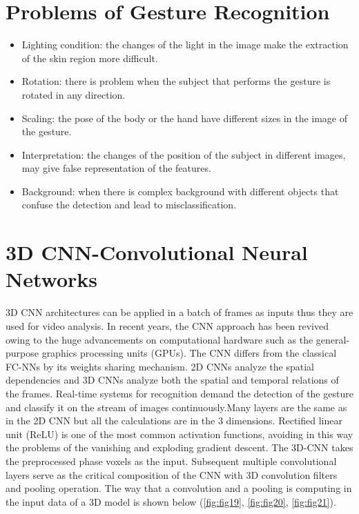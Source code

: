 \documentclass[12pt]{book}
\begin{document}
\chapter{Problems of Gesture Recognition}
\begin{itemize}
    \item Lighting condition: the changes of the light in the image make the extraction of the skin region more difficult.  

\item Rotation: there is problem when the subject that performs the gesture is rotated in any direction. 

\item Scaling: the pose of the body or the hand have different sizes in the image of the gesture. 

\item Interpretation: the changes of the position of the subject in different images, may give false representation of the features.  

\item Background: when there is complex background with different objects that confuse the detection and lead to misclassification. 
\end{itemize}

\chapter{3D CNN-Convolutional Neural Networks}
3D CNN architectures can be applied in a batch of  frames as inputs thus they are used for video analysis. In recent years, the CNN approach has been revived owing to the huge advancements on computational hardware such as the general-purpose graphics processing units (GPUs). The CNN differs from the classical FC-NNs by its weights sharing mechanism. 2D CNNs analyze the spatial dependencies and 3D CNNs analyze both the spatial and temporal relations of the frames. Real-time systems for recognition demand the detection of the gesture and classify it on the stream of images continuously.Many layers are the same as in the 2D CNN but all the calculations are in the 3 dimensions. Rectified linear unit (ReLU) is one of the most common activation functions, avoiding in this way the problems of the vanishing and exploding gradient descent. The 3D-CNN takes the preprocessed phase voxels as the input. Subsequent multiple convolutional layers serve as the critical composition of the CNN with 3D convolution filters and pooling operation. The way that a convolution and a pooling is computing in the input data of a 3D model is shown below (\ref{fig:fig19}, \ref{fig:fig20}, \ref{fig:fig21}). 
\end{document}
